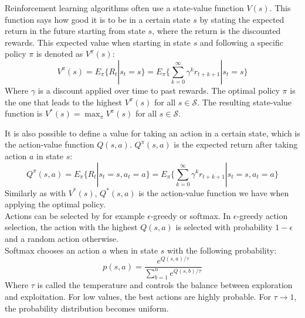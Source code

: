 \documentclass[a4paper]{article}
\begin{document}
Reinforcement learning algorithms often use a state-value function $V(s)$. This function says how good it is to be in a certain state $s$ by stating the expected return in the future starting from state $s$, where the return is the discounted rewards. This expected value when starting in state $s$ and following a specific policy $\pi$ is denoted as $V^\pi(s)$:
\begin{equation}
\label{eq:vpolicy}
V^\pi(s) = E_\pi\{R_t|s_t=s\}=E_\pi\big \{ \sum_{k=0}^{\infty}\gamma^k r_{t+k+1} | s_t=s\big \}
\end{equation}
Where $\gamma$ is a discount applied over time to past rewards. The optimal policy $\pi$ is the one that leads to the highest $V^\pi(s)$ for all $s \in \mathcal{S}$. The resulting state-value function is $V^*(s) = \max_\pi V^\pi(s)$ for all $s \in \mathcal{S}$.


It is also possible to define a value for taking an action in a certain state, which is the action-value function $Q(s,a)$. $Q^\pi(s,a)$ is the expected return after taking action $a$ in state $s$:
\begin{equation}
Q^\pi(s,a) = E_\pi\{R_t|s_t=s,a_t=a\}=E_\pi\big \{ \sum_{k=0}^{\infty}\gamma^k r_{t+k+1} | s_t=s,a_t=a\big \}
\end{equation}
Similarly as with $V^*(s)$, $Q^*(s,a)$ is the action-value function we have when applying the optimal policy.\\
Actions can be selected by for example $\epsilon$-greedy or softmax. In $\epsilon$-greedy action selection, the action with the highest $Q(s,a)$ is selected with probability $1-\epsilon$ and a random action otherwise.\\
Softmax chooses an action $a$ when in state $s$ with the following probability:
\begin{equation}
p(s,a) = \frac{e^{Q(s,a)/\tau}}{\sum_{b=1}^n e^{Q(s,b)/\tau}}
\end{equation}
Where $\tau$ is called the temperature and controls the balance between exploration and exploitation. For low values, the best actions are highly probable. For $\tau \to 1$, the probability distribution becomes uniform.\\
\end{document}
